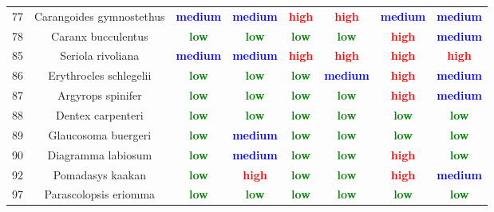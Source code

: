 \documentclass{report}\usepackage[]{graphicx}\usepackage[]{color}
\begin{document}
\begin{table}[ht]
{\begin{tabular}{cccccccc}
   77 & Carangoides gymnostethus & \textcolor{blue}{\textbf{medium}} & \textcolor{blue}{\textbf{medium}} & \textcolor{red}{\textbf{high}} & \textcolor{red}{\textbf{high}} & \textcolor{blue}{\textbf{medium}} & \textcolor{blue}{\textbf{medium}} \\ 
   78 & Caranx bucculentus & \textcolor{green}{\textbf{low}} & \textcolor{green}{\textbf{low}} & \textcolor{green}{\textbf{low}} & \textcolor{green}{\textbf{low}} & \textcolor{red}{\textbf{high}} & \textcolor{blue}{\textbf{medium}} \\ 
   85 & Seriola rivoliana & \textcolor{blue}{\textbf{medium}} & \textcolor{blue}{\textbf{medium}} & \textcolor{red}{\textbf{high}} & \textcolor{red}{\textbf{high}} & \textcolor{red}{\textbf{high}} & \textcolor{red}{\textbf{high}} \\ 
   86 & Erythrocles schlegelii & \textcolor{green}{\textbf{low}} & \textcolor{green}{\textbf{low}} & \textcolor{green}{\textbf{low}} & \textcolor{blue}{\textbf{medium}} & \textcolor{red}{\textbf{high}} & \textcolor{blue}{\textbf{medium}} \\ 
   87 & Argyrops spinifer & \textcolor{green}{\textbf{low}} & \textcolor{green}{\textbf{low}} & \textcolor{green}{\textbf{low}} & \textcolor{green}{\textbf{low}} & \textcolor{red}{\textbf{high}} & \textcolor{blue}{\textbf{medium}} \\ 
   88 & Dentex carpenteri & \textcolor{green}{\textbf{low}} & \textcolor{green}{\textbf{low}} & \textcolor{green}{\textbf{low}} & \textcolor{green}{\textbf{low}} & \textcolor{green}{\textbf{low}} & \textcolor{green}{\textbf{low}} \\ 
   89 & Glaucosoma buergeri & \textcolor{green}{\textbf{low}} & \textcolor{blue}{\textbf{medium}} & \textcolor{green}{\textbf{low}} & \textcolor{green}{\textbf{low}} & \textcolor{green}{\textbf{low}} & \textcolor{green}{\textbf{low}} \\ 
   90 & Diagramma labiosum & \textcolor{green}{\textbf{low}} & \textcolor{blue}{\textbf{medium}} & \textcolor{green}{\textbf{low}} & \textcolor{green}{\textbf{low}} & \textcolor{red}{\textbf{high}} & \textcolor{green}{\textbf{low}} \\ 
   92 & Pomadasys kaakan & \textcolor{green}{\textbf{low}} & \textcolor{red}{\textbf{high}} & \textcolor{green}{\textbf{low}} & \textcolor{green}{\textbf{low}} & \textcolor{red}{\textbf{high}} & \textcolor{blue}{\textbf{medium}} \\ 
   97 & Parascolopsis eriomma & \textcolor{green}{\textbf{low}} & \textcolor{green}{\textbf{low}} & \textcolor{green}{\textbf{low}} & \textcolor{green}{\textbf{low}} & \textcolor{green}{\textbf{low}} & \textcolor{green}{\textbf{low}} \\ 

\end{tabular}}
\end{table}
\end{document}
